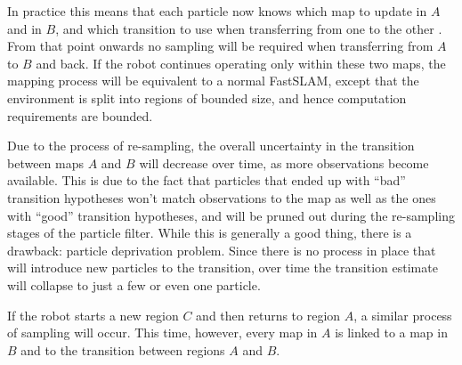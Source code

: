 In practice this means that each particle now knows which map to
update in $A$ and in $B$, and which transition to use when
transferring from one to the other . From that point onwards no sampling will be required
when transferring from $A$ to $B$ and back. If the robot continues
operating only within these two maps, the mapping process will be
equivalent to a normal FastSLAM, except that the environment is split
into regions of bounded size, and hence computation requirements are
bounded.

Due to the process of re-sampling, the overall uncertainty in the
transition between maps $A$ and $B$ will decrease over time, as more
observations become available. This is due to the fact that particles
that ended up with ``bad'' transition hypotheses won't match
observations to the map as well as the ones with ``good'' transition
hypotheses, and will be pruned out during the re-sampling stages of
the particle filter. While this is generally a good thing, there is a
drawback: particle deprivation problem. Since there is no process in
place that will introduce new particles to the transition, over time
the transition estimate will collapse to just a few or even one
particle. 


If the robot starts a new region $C$ and then returns to
region $A$, a similar process of sampling will occur. This time,
however, every map in $A$ is linked to a map in $B$ and to the
transition between regions $A$ and $B$.


